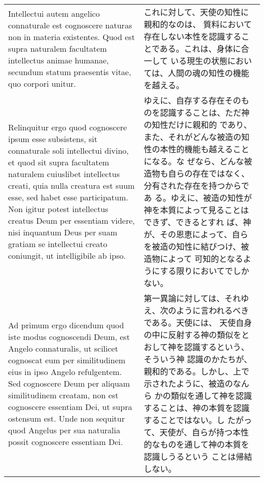 \documentclass[10pt]{jsarticle} %
\begin{document}
\begin{longtable}{p{21em}p{21em}}
\\



Intellectui autem angelico
connaturale est cognoscere naturas non in materia existentes. Quod est
supra naturalem facultatem intellectus animae humanae, secundum statum
praesentis vitae, quo corpori unitur.

&

これに対して、天使の知性に親和的なのは、
質料において存在しない本性を認識することである。これは、身体に合一して
いる現生の状態においては、人間の魂の知性の機能を越える。

\\


Relinquitur ergo quod cognoscere ipsum esse subsistens, sit
connaturale soli intellectui divino, et quod sit supra facultatem
naturalem cuiuslibet intellectus creati, quia nulla creatura est suum
esse, sed habet esse participatum. Non igitur potest intellectus
creatus Deum per essentiam videre, nisi inquantum Deus per suam
gratiam se intellectui creato coniungit, ut intelligibile ab ipso.


&

ゆえに、自存する存在そのものを認識することは、ただ神の知性だけに親和的
であり、また、それがどんな被造の知性の本性的機能も越えることになる。な
ぜなら、どんな被造物も自らの存在ではなく、分有された存在を持つからであ
る。ゆえに、被造の知性が神を本質によって見ることはできず、できるとすれ
ば、神が、その恩恵によって、自らを被造の知性に結びつけ、被造物によって
可知的となるようにする限りにおいてでしかない。


\\


{\sc Ad primum ergo dicendum} quod iste modus cognoscendi Deum, est
Angelo connaturalis, ut scilicet cognoscat eum per similitudinem eius
in ipso Angelo refulgentem. Sed cognoscere Deum per aliquam
similitudinem creatam, non est cognoscere essentiam Dei, ut supra
ostensum est. Unde non sequitur quod Angelus per sua naturalia possit
cognoscere essentiam Dei.

&

第一異論に対しては、それゆえ、次のように言われるべきである。天使には、
天使自身の中に反射する神の類似をとおして神を認識するという、そういう神
認識のかたちが、親和的である。しかし、上で示されたように、被造のなんら
かの類似を通して神を認識することは、神の本質を認識することではない。し
たがって、天使が、自らが持つ本性的なものを通して神の本質を認識しうるという
ことは帰結しない。

\\



\end{longtable}
\end{document}
